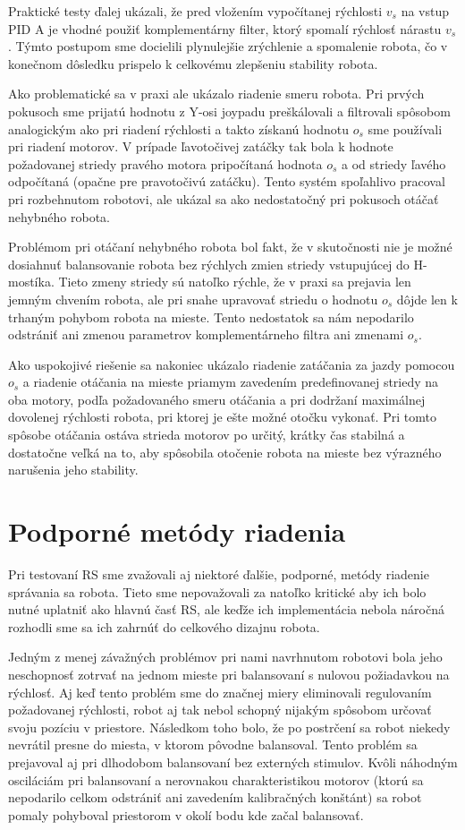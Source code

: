 Praktické testy ďalej ukázali, že pred vložením vypočítanej rýchlosti $v_s$ na vstup PID A je vhodné použiť komplementárny filter, ktorý spomalí rýchlosť nárastu $v_s$. Týmto postupom sme docielili plynulejšie zrýchlenie a spomalenie robota, čo v konečnom dôsledku prispelo k celkovému zlepšeniu stability robota.

Ako problematické sa v praxi ale ukázalo riadenie smeru robota. Pri prvých pokusoch sme prijatú hodnotu z Y-osi joypadu preškálovali a filtrovali spôsobom analogickým ako pri riadení rýchlosti a takto získanú hodnotu $o_s$ sme používali pri riadení motorov. V prípade ľavotočivej zatáčky tak bola k hodnote požadovanej striedy pravého motora pripočítaná hodnota $o_s$ a od striedy ľavého odpočítaná (opačne pre pravotočivú zatáčku). Tento systém spoľahlivo pracoval pri rozbehnutom robotovi, ale ukázal sa ako nedostatočný pri pokusoch otáčať nehybného robota.

Problémom pri otáčaní nehybného robota bol fakt, že v skutočnosti nie je možné dosiahnuť balansovanie robota bez rýchlych zmien striedy vstupujúcej do H-mostíka. Tieto zmeny striedy sú natoľko rýchle, že v praxi sa prejavia len jemným chvením robota, ale pri snahe upravovať striedu o hodnotu $o_s$ dôjde len k trhaným pohybom robota na mieste. Tento nedostatok sa nám nepodarilo odstrániť ani zmenou parametrov komplementárneho filtra ani zmenami $o_s$.

Ako uspokojivé riešenie sa nakoniec ukázalo riadenie zatáčania za jazdy pomocou $o_s$ a riadenie otáčania na mieste priamym zavedením predefinovanej striedy na oba motory, podľa požadovaného smeru otáčania a pri dodržaní maximálnej dovolenej rýchlosti robota, pri ktorej je ešte možné otočku vykonať. Pri tomto spôsobe otáčania ostáva strieda motorov po určitý, krátky čas stabilná a dostatočne veľká na to, aby spôsobila otočenie robota na mieste bez výrazného narušenia jeho stability. 

\section{Podporné metódy riadenia}
Pri testovaní RS sme zvažovali aj niektoré ďalšie, podporné, metódy riadenie správania sa robota. Tieto sme nepovažovali za natoľko kritické aby ich bolo nutné uplatniť ako hlavnú časť \ac{RS}, ale keďže ich implementácia nebola náročná rozhodli sme sa ich zahrnúť do celkového dizajnu robota.

Jedným z menej závažných problémov pri nami navrhnutom robotovi bola jeho neschopnosť zotrvať na jednom mieste pri balansovaní s nulovou požiadavkou na rýchlosť. Aj keď tento problém sme do značnej miery eliminovali regulovaním požadovanej rýchlosti, robot aj tak nebol schopný nijakým spôsobom určovať svoju pozíciu v priestore. Následkom toho bolo, že po postrčení sa robot niekedy nevrátil presne do miesta, v ktorom pôvodne balansoval. Tento problém sa prejavoval aj pri dlhodobom balansovaní bez externých stimulov. Kvôli náhodným osciláciám pri balansovaní a nerovnakou charakteristikou motorov (ktorú sa nepodarilo celkom odstrániť ani zavedením kalibračných konštánt) sa robot pomaly pohyboval priestorom v okolí bodu kde začal balansovať.  

